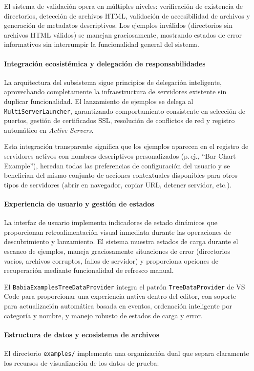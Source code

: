 \documentclass[a4paper, 12pt]{book}
\begin{document}
El sistema de validación opera en múltiples niveles: verificación de existencia de directorios, detección de archivos HTML, validación de accesibilidad de archivos y generación de metadatos descriptivos. Los ejemplos inválidos (directorios sin archivos HTML válidos) se manejan graciosamente, mostrando estados de error informativos sin interrumpir la funcionalidad general del sistema.

\paragraph{Integración ecosistémica y delegación de responsabilidades}
La arquitectura del subsistema sigue principios de delegación inteligente, aprovechando completamente la infraestructura de servidores existente sin duplicar funcionalidad. El lanzamiento de ejemplos se delega al \texttt{MultiServerLauncher}, garantizando comportamiento consistente en selección de puertos, gestión de certificados SSL, resolución de conflictos de red y registro automático en \emph{Active Servers}.

Esta integración transparente significa que los ejemplos aparecen en el registro de servidores activos con nombres descriptivos personalizados (p.\,ej., ``Bar Chart Example''), heredan todas las preferencias de configuración del usuario y se benefician del mismo conjunto de acciones contextuales disponibles para otros tipos de servidores (abrir en navegador, copiar URL, detener servidor, etc.).

\paragraph{Experiencia de usuario y gestión de estados}
La interfaz de usuario implementa indicadores de estado dinámicos que proporcionan retroalimentación visual inmediata durante las operaciones de descubrimiento y lanzamiento. El sistema muestra estados de carga durante el escaneo de ejemplos, maneja graciosamente situaciones de error (directorios vacíos, archivos corruptos, fallos de servidor) y proporciona opciones de recuperación mediante funcionalidad de refresco manual.

El \texttt{BabiaExamplesTreeDataProvider} integra el patrón \texttt{TreeDataProvider} de VS Code para proporcionar una experiencia nativa dentro del editor, con soporte para actualización automática basada en eventos, ordenación inteligente por categoría y nombre, y manejo robusto de estados de carga y error.

\paragraph{Estructura de datos y ecosistema de archivos}
El directorio \texttt{examples/} implementa una organización dual que separa claramente los recursos de visualización de los datos de prueba:
\end{document}
